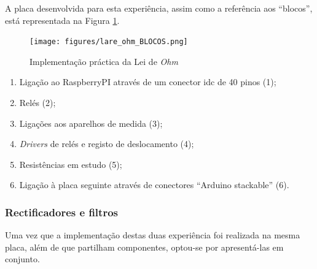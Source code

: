 A placa desenvolvida para esta experiência, assim como a referência aos ``blocos'', está representada na Figura \ref{fig:placaleideohm}. 

\begin{figure}[hbtp]
	\centering
	\texttt{[image: figures/lare\_ohm\_BLOCOS.png]}
	\caption{Implementação práctica da Lei de \textit{Ohm}}
	\label{fig:placaleideohm}
\end{figure}

\begin{enumerate}
	\item Ligação ao \gls{RaspberryPI} através de um conector \acrfull{idc} de 40 pinos (1);
	\item Relés (2);
	\item Ligações aos aparelhos de medida (3);
	\item \textit{Drivers} de relés e registo de deslocamento (4);
	\item Resistências em estudo (5);
	\item Ligação à placa seguinte através de conectores ``Arduino stackable'' (6).
\end{enumerate}

\subsubsection{Rectificadores e filtros}
\label{sec:rectificadoresfiltros}
Uma vez que a implementação destas duas experiência foi realizada na mesma placa, além de que partilham componentes, optou-se por apresentá-las em conjunto. 

